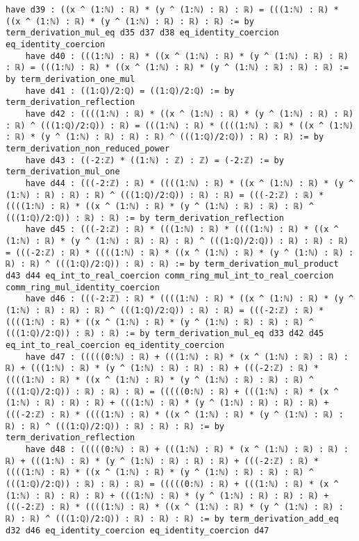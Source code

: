\documentclass{article}
\begin{document}
\begin{tcolorbox}[colback=white!10, width=\linewidth]
\begin{lstlisting}[language=Lean4]
    have d39 : ((x ^ (1:ℕ) : ℝ) * (y ^ (1:ℕ) : ℝ) : ℝ) = (((1:ℕ) : ℝ) * ((x ^ (1:ℕ) : ℝ) * (y ^ (1:ℕ) : ℝ) : ℝ) : ℝ) := by term_derivation_mul_eq d35 d37 d38 eq_identity_coercion eq_identity_coercion
    have d40 : (((1:ℕ) : ℝ) * ((x ^ (1:ℕ) : ℝ) * (y ^ (1:ℕ) : ℝ) : ℝ) : ℝ) = (((1:ℕ) : ℝ) * ((x ^ (1:ℕ) : ℝ) * (y ^ (1:ℕ) : ℝ) : ℝ) : ℝ) := by term_derivation_one_mul
    have d41 : ((1:ℚ)/2:ℚ) = ((1:ℚ)/2:ℚ) := by term_derivation_reflection
    have d42 : ((((1:ℕ) : ℝ) * ((x ^ (1:ℕ) : ℝ) * (y ^ (1:ℕ) : ℝ) : ℝ) : ℝ) ^ (((1:ℚ)/2:ℚ)) : ℝ) = (((1:ℕ) : ℝ) * ((((1:ℕ) : ℝ) * ((x ^ (1:ℕ) : ℝ) * (y ^ (1:ℕ) : ℝ) : ℝ) : ℝ) ^ (((1:ℚ)/2:ℚ)) : ℝ) : ℝ) := by term_derivation_non_reduced_power
    have d43 : ((-2:ℤ) * ((1:ℕ) : ℤ) : ℤ) = (-2:ℤ) := by term_derivation_mul_one
    have d44 : (((-2:ℤ) : ℝ) * ((((1:ℕ) : ℝ) * ((x ^ (1:ℕ) : ℝ) * (y ^ (1:ℕ) : ℝ) : ℝ) : ℝ) ^ (((1:ℚ)/2:ℚ)) : ℝ) : ℝ) = (((-2:ℤ) : ℝ) * ((((1:ℕ) : ℝ) * ((x ^ (1:ℕ) : ℝ) * (y ^ (1:ℕ) : ℝ) : ℝ) : ℝ) ^ (((1:ℚ)/2:ℚ)) : ℝ) : ℝ) := by term_derivation_reflection
    have d45 : (((-2:ℤ) : ℝ) * (((1:ℕ) : ℝ) * ((((1:ℕ) : ℝ) * ((x ^ (1:ℕ) : ℝ) * (y ^ (1:ℕ) : ℝ) : ℝ) : ℝ) ^ (((1:ℚ)/2:ℚ)) : ℝ) : ℝ) : ℝ) = (((-2:ℤ) : ℝ) * ((((1:ℕ) : ℝ) * ((x ^ (1:ℕ) : ℝ) * (y ^ (1:ℕ) : ℝ) : ℝ) : ℝ) ^ (((1:ℚ)/2:ℚ)) : ℝ) : ℝ) := by term_derivation_mul_product d43 d44 eq_int_to_real_coercion comm_ring_mul_int_to_real_coercion comm_ring_mul_identity_coercion
    have d46 : (((-2:ℤ) : ℝ) * ((((1:ℕ) : ℝ) * ((x ^ (1:ℕ) : ℝ) * (y ^ (1:ℕ) : ℝ) : ℝ) : ℝ) ^ (((1:ℚ)/2:ℚ)) : ℝ) : ℝ) = (((-2:ℤ) : ℝ) * ((((1:ℕ) : ℝ) * ((x ^ (1:ℕ) : ℝ) * (y ^ (1:ℕ) : ℝ) : ℝ) : ℝ) ^ (((1:ℚ)/2:ℚ)) : ℝ) : ℝ) := by term_derivation_mul_eq d33 d42 d45 eq_int_to_real_coercion eq_identity_coercion
    have d47 : (((((0:ℕ) : ℝ) + (((1:ℕ) : ℝ) * (x ^ (1:ℕ) : ℝ) : ℝ) : ℝ) + (((1:ℕ) : ℝ) * (y ^ (1:ℕ) : ℝ) : ℝ) : ℝ) + (((-2:ℤ) : ℝ) * ((((1:ℕ) : ℝ) * ((x ^ (1:ℕ) : ℝ) * (y ^ (1:ℕ) : ℝ) : ℝ) : ℝ) ^ (((1:ℚ)/2:ℚ)) : ℝ) : ℝ) : ℝ) = (((((0:ℕ) : ℝ) + (((1:ℕ) : ℝ) * (x ^ (1:ℕ) : ℝ) : ℝ) : ℝ) + (((1:ℕ) : ℝ) * (y ^ (1:ℕ) : ℝ) : ℝ) : ℝ) + (((-2:ℤ) : ℝ) * ((((1:ℕ) : ℝ) * ((x ^ (1:ℕ) : ℝ) * (y ^ (1:ℕ) : ℝ) : ℝ) : ℝ) ^ (((1:ℚ)/2:ℚ)) : ℝ) : ℝ) : ℝ) := by term_derivation_reflection
    have d48 : (((((0:ℕ) : ℝ) + (((1:ℕ) : ℝ) * (x ^ (1:ℕ) : ℝ) : ℝ) : ℝ) + (((1:ℕ) : ℝ) * (y ^ (1:ℕ) : ℝ) : ℝ) : ℝ) + (((-2:ℤ) : ℝ) * ((((1:ℕ) : ℝ) * ((x ^ (1:ℕ) : ℝ) * (y ^ (1:ℕ) : ℝ) : ℝ) : ℝ) ^ (((1:ℚ)/2:ℚ)) : ℝ) : ℝ) : ℝ) = (((((0:ℕ) : ℝ) + (((1:ℕ) : ℝ) * (x ^ (1:ℕ) : ℝ) : ℝ) : ℝ) + (((1:ℕ) : ℝ) * (y ^ (1:ℕ) : ℝ) : ℝ) : ℝ) + (((-2:ℤ) : ℝ) * ((((1:ℕ) : ℝ) * ((x ^ (1:ℕ) : ℝ) * (y ^ (1:ℕ) : ℝ) : ℝ) : ℝ) ^ (((1:ℚ)/2:ℚ)) : ℝ) : ℝ) : ℝ) := by term_derivation_add_eq d32 d46 eq_identity_coercion eq_identity_coercion d47

\end{lstlisting}
\end{tcolorbox}
\end{document}
